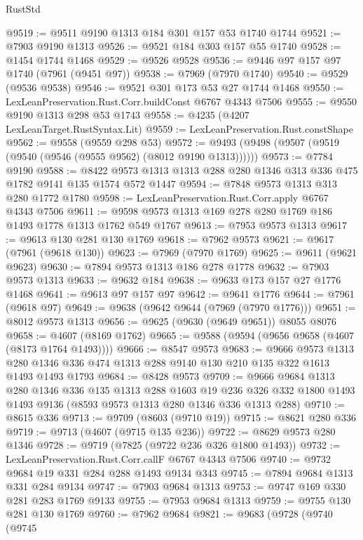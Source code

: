 \begin{lexlean}{RustStd}
\begin{coremodule}
@9519 := @9511 @9190 @1313 @184 @301 @157 @53 @1740 @1744
@9521 := @7903 @9190 @1313
@9526 := @9521 @184 @303 @157 @55 @1740
@9528 := @1454 @1744 @1468
@9529 := @9526 @9528
@9536 := @9446 @97 @157 @97 @1740 (@7961 (@9451 @97))
@9538 := @7969 (@7970 @1740)
@9540 := @9529 (@9536 @9538)
@9546 := @9521 @301 @173 @53 @27 @1744 @1468
@9550 := LexLeanPreservation.Rust.Corr.buildConst @6767 @4343 @7506
@9555 := @9550 @9190 @1313 @298 @53 @1743
@9558 := @4235 (@4207 LexLeanTarget.RustSyntax.Lit)
@9559 := LexLeanPreservation.Rust.constShape
@9562 := @9558 (@9559 @298 @53)
@9572 := @9493 (@9498 (@9507 (@9519 (@9540 (@9546 (@9555 @9562) (@8012 @9190 @1313))))))
@9573 := @7784 @9190
@9588 := @8422 @9573 @1313 @1313 @288 @280 @1346 @313 @336 @475 @1782 @9141 @135 @1574 @572 @1447
@9594 := @7848 @9573 @1313 @313 @280 @1772 @1780
@9598 := LexLeanPreservation.Rust.Corr.apply @6767 @4343 @7506
@9611 := @9598 @9573 @1313 @169 @278 @280 @1769 @186 @1493 @1778 @1313 @1762 @549 @1767
@9613 := @7953 @9573 @1313
@9617 := @9613 @130 @281 @130 @1769
@9618 := @7962 @9573
@9621 := @9617 (@7961 (@9618 @130))
@9623 := @7969 (@7970 @1769)
@9625 := @9611 (@9621 @9623)
@9630 := @7894 @9573 @1313 @186 @278 @1778
@9632 := @7903 @9573 @1313
@9633 := @9632 @184
@9638 := @9633 @173 @157 @27 @1776 @1468
@9641 := @9613 @97 @157 @97
@9642 := @9641 @1776
@9644 := @7961 (@9618 @97)
@9649 := @9638 (@9642 @9644 (@7969 (@7970 @1776)))
@9651 := @8012 @9573 @1313
@9656 := @9625 (@9630 (@9649 @9651)) @8055 @8076
@9658 := @4607 (@8169 @1762)
@9665 := @9588 (@9594 (@9656 @9658 (@4607 (@8173 @1764 @1493))))
@9666 := @8547 @9573
@9683 := @9666
    @9573
    @1313
    @280
    @1346
    @336
    @474
    @1313
    @288
    @9140
    @130
    @210
    @135
    @322
    @1613
    @1493
    @1493
    @1793
@9684 := @8428 @9573
@9709 := @9666
    @9684
    @1313
    @280
    @1346
    @336
    @135
    @1313
    @288
    @1603
    @19
    @236
    @326
    @332
    @1800
    @1493
    @1493
    @9136
    (@8593 @9573 @1313 @280 @1346 @336 @1313 @288)
@9710 := @8615 @336
@9713 := @9709 (@8603 (@9710 @19))
@9715 := @8621 @280 @336
@9719 := @9713 (@4607 (@9715 @135 @236))
@9722 := @8629 @9573 @280 @1346
@9728 := @9719 (@7825 (@9722 @236 @326 @1800 @1493))
@9732 := LexLeanPreservation.Rust.Corr.callF @6767 @4343 @7506
@9740 := @9732 @9684 @19 @331 @284 @288 @1493 @9134 @343
@9745 := @7894 @9684 @1313 @331 @284 @9134
@9747 := @7903 @9684 @1313
@9753 := @9747 @169 @330 @281 @283 @1769 @9133
@9755 := @7953 @9684 @1313
@9759 := @9755 @130 @281 @130 @1769
@9760 := @7962 @9684
@9821 := @9683
    (@9728
      (@9740
        (@9745

\end{coremodule}
\end{lexlean}
